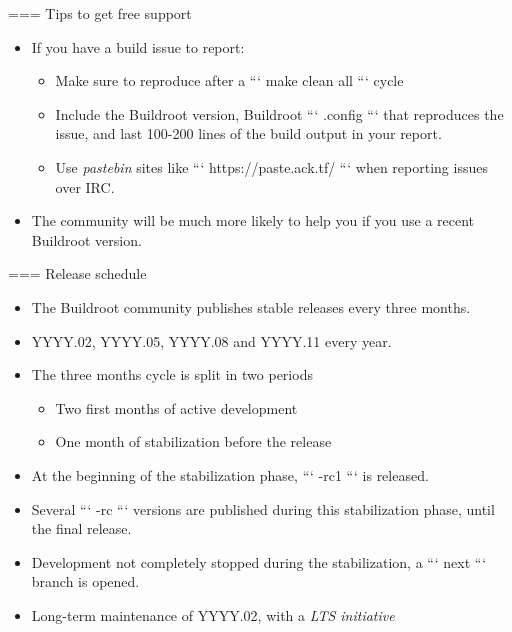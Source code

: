 === {Tips to get free support}
  \begin{itemize}
  \item If you have a build issue to report:
    \begin{itemize}
    \item Make sure to reproduce after a ``` make clean all ``` cycle
    \item Include the Buildroot version, Buildroot ``` .config ``` that
      reproduces the issue, and last 100-200 lines of the build
      output in your report.
    \item Use {\em pastebin} sites like ``` https://paste.ack.tf/ ```
      when reporting issues over IRC.
    \end{itemize}
  \item The community will be much more likely to help you if you use
    a recent Buildroot version.
  \end{itemize}


=== {Release schedule}
  \begin{itemize}
  \item The Buildroot community publishes stable releases every three
    months.
  \item YYYY.02, YYYY.05, YYYY.08 and YYYY.11 every year.
  \item The three months cycle is split in two periods
    \begin{itemize}
    \item Two first months of active development
    \item One month of stabilization before the release
    \end{itemize}
  \item At the beginning of the stabilization phase, ``` -rc1 ``` is
    released.
  \item Several ``` -rc ``` versions are published during this
    stabilization phase, until the final release.
  \item Development not completely stopped during the stabilization, a
    ``` next ``` branch is opened.
  \item Long-term maintenance of YYYY.02, with a {\em LTS initiative}
  \end{itemize}


